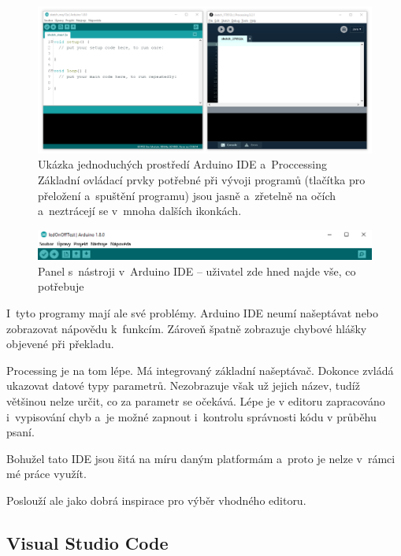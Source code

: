\begin{figure}[h]
    \centering
    \includegraphics[width=\textwidth]{images/arduino+processing.png}
    \caption[Ukázka jednoduchých prostředí Arduino IDE a~Proccessing]{Ukázka jednoduchých prostředí Arduino IDE a~Proccessing \\
    Základní ovládací prvky potřebné při vývoji programů (tlačítka pro přeložení a~spuštění programu) jsou jasně a~zřetelně na očích a~neztrácejí se v~mnoha dalších ikonkách.}
    \label{fig:arduino+processing}
\end{figure}

\begin{figure}[h]
    \centering
    \includegraphics[width=\textwidth]{images/arduino-ide_tools-panel.png}
    \caption{Panel s~nástroji v~Arduino IDE -- uživatel zde hned najde vše, co potřebuje}
    \label{fig:arduino-ide_tools-panel}
\end{figure}

I~tyto programy mají ale své problémy. 
Arduino IDE neumí našeptávat nebo zobrazovat nápovědu k~funkcím. 
Zároveň špatně zobrazuje chybové hlášky objevené při překladu.

Processing je na tom lépe. 
Má integrovaný základní našeptávač. 
Dokonce zvládá ukazovat datové typy parametrů.
Nezobrazuje však už jejich název, tudíž většinou nelze určit, co za parametr se očekává.
Lépe je v editoru zapracováno i~vypisování chyb a~je možné zapnout i~kontrolu správnosti kódu v průběhu psaní.

Bohužel tato IDE jsou šitá na míru daným platformám a~proto je nelze v~rámci mé práce využít. 

Poslouží ale jako dobrá inspirace pro výběr vhodného editoru.

\subsection{Visual Studio Code}


